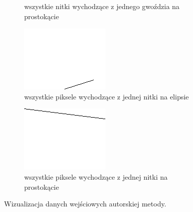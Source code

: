 \begin{figure}[htb]
\begin{subfigure}{0.49\textwidth}
        \caption{wszystkie nitki wychodzące z jednego gwoździa na prostokącie}
        \label{wlasne-dane-slownikowe-4}
    \end{subfigure}
    \begin{subfigure}{0.49\textwidth}
        \centering
        \includegraphics[width = \textwidth]{img/4-mine/points-from-thread-of-elipse.png}
        \caption{wszystkie piksele wychodzące z jednej nitki na elipsie}
        \label{wlasne-dane-slownikowe-5}
    \end{subfigure}
    \begin{subfigure}{0.49\textwidth}
        \centering
        \includegraphics[width = \textwidth]{img/4-mine/points-from-thread-of-rectangle.png}
        \caption{wszystkie piksele wychodzące z jednej nitki na prostokącie}
        \label{wlasne-dane-slownikowe-6}
    \end{subfigure}
    \caption{Wizualizacja danych wejściowych autorskiej metody.}
    \label{wlasne-dane-slownikowe}
    \end{figure}
    
